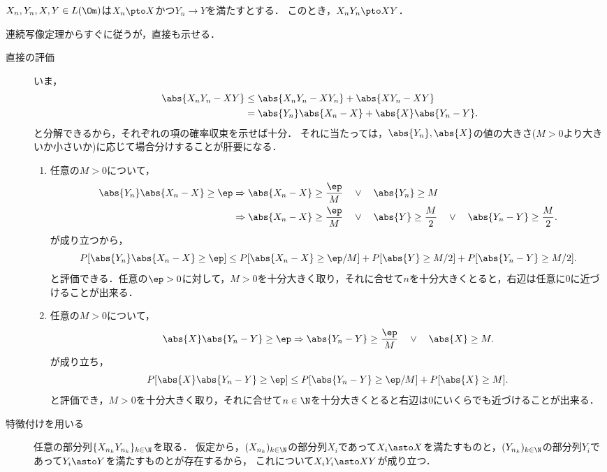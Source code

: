 \documentclass[uplatex,dvipdfmx]{jsreport}
\begin{document}
\begin{corollary}
    $X_n,Y_n,X,Y\in L(\Om)$は$X_n\pto X$かつ$Y_n\to Y$を満たすとする．
    このとき，$X_nY_n\pto XY$．
\end{corollary}
\begin{Proof}
    連続写像定理からすぐに従うが，直接も示せる．
    \begin{description}
        \item[直接の評価] いま，
        \begin{align*}
            \abs{X_nY_n-XY}&\le\abs{X_nY_n-XY_n}+\abs{XY_n-XY}\\
            &=\abs{Y_n}\abs{X_n-X}+\abs{X}\abs{Y_n-Y}.
        \end{align*}
        と分解できるから，それぞれの項の確率収束を示せば十分．
        それに当たっては，$\abs{Y_n},\abs{X}$の値の大きさ($M>0$より大きいか小さいか)に応じて場合分けすることが肝要になる．
        \begin{enumerate}[{第}1{項}]
            \item 任意の$M>0$について，
            \begin{align*}
                \abs{Y_n}\abs{X_n-X}\ge\ep&\Rightarrow \abs{X_n-X}\ge\frac{\ep}{M}\quad\lor\quad\abs{Y_n}\ge M\\
                &\Rightarrow \abs{X_n-X}\ge\frac{\ep}{M}\quad\lor\quad\abs{Y}\ge\frac{M}{2}\quad\lor\quad\abs{Y_n-Y}\ge \frac{M}{2}.
            \end{align*}
            が成り立つから，
            \[P[\abs{Y_n}\abs{X_n-X}\ge\ep]\le P[\abs{X_n-X}\ge\ep/M]+P[\abs{Y}\ge M/2]+P[\abs{Y_n-Y}\ge M/2].\]
            と評価できる．任意の$\ep>0$に対して，$M>0$を十分大きく取り，それに合せて$n$を十分大きくとると，右辺は任意に$0$に近づけることが出来る．
            \item 任意の$M>0$について，
            \[\abs{X}\abs{Y_n-Y}\ge\ep\Rightarrow\abs{Y_n-Y}\ge\frac{\ep}{M}\quad\lor\quad\abs{X}\ge M.\]
            が成り立ち，
            \[P[\abs{X}\abs{Y_n-Y}\ge\ep]\le P[\abs{Y_n-Y}\ge\ep/M]+P[\abs{X}\ge M].\]
            と評価でき，$M>0$を十分大きく取り，それに合せて$n\in\N$を十分大きくとると右辺は$0$にいくらでも近づけることが出来る．
        \end{enumerate}
        \item[特徴付けを用いる] 任意の部分列$\{X_{n_k}Y_{n_k}\}_{k\in\N}$を取る．
        仮定から，$(X_{n_k})_{k\in\N}$の部分列$X_{i}$であって$X_i\asto X$を満たすものと，$(Y_{n_k})_{k\in\N}$の部分列$Y_i$であって$Y_i\asto Y$を満たすものとが存在するから，
        これについて$X_iY_i\asto XY$が成り立つ．
    \end{description}
\end{Proof}
\end{document}
